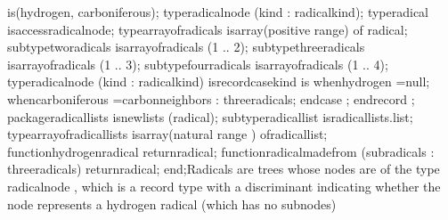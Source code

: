 \tyxtstxbf[]is\tyxtstxendbf[] (hydrogen, carboniferous);
   \tyxtstxbf[]type\tyxtstxendbf[] radical\Symuns[]node (kind : radical\Symuns[]kind);
   \tyxtstxbf[]type\tyxtstxendbf[] radical           %
\tyxtstxbf[]is\tyxtstxendbf[] \tyxtstxbf[]access\tyxtstxendbf[] radical\Symuns[]node;
   \tyxtstxbf[]type\tyxtstxendbf[] array\Symuns[]of\Symuns[]radicals %
\tyxtstxbf[]is\tyxtstxendbf[] \tyxtstxbf[]array\tyxtstxendbf[] (positive %
\tyxtstxbf[]range\tyxtstxendbf[] \Symlt[]\Symgt[]) \tyxtstxbf[]of%
\tyxtstxendbf[] radical;
   \tyxtstxbf[]subtype\tyxtstxendbf[] two\Symuns[]radicals   %
\tyxtstxbf[]is\tyxtstxendbf[] array\Symuns[]of\Symuns[]radicals (1 .. 2);
   \tyxtstxbf[]subtype\tyxtstxendbf[] three\Symuns[]radicals %
\tyxtstxbf[]is\tyxtstxendbf[] array\Symuns[]of\Symuns[]radicals (1 .. 3);
   \tyxtstxbf[]subtype\tyxtstxendbf[] four\Symuns[]radicals  %
\tyxtstxbf[]is\tyxtstxendbf[] array\Symuns[]of\Symuns[]radicals (1 .. 4);
   \tyxtstxbf[]type\tyxtstxendbf[] radical\Symuns[]node (kind : radical\Symuns[]kind) %
\tyxtstxbf[]is\tyxtstxendbf[] \tyxtstxbf[]record\tyxtstxendbf[]
      \tyxtstxbf[]case\tyxtstxendbf[] kind \tyxtstxbf[]is%
\tyxtstxendbf[]
      \tyxtstxbf[]when\tyxtstxendbf[] hydrogen =\Symgt[]
         \tyxtstxbf[]null\tyxtstxendbf[];
      \tyxtstxbf[]when\tyxtstxendbf[] carboniferous =\Symgt[]
         carbon\Symuns[]neighbors : three\Symuns[]radicals;
      \tyxtstxbf[]end\tyxtstxendbf[] \tyxtstxbf[]case%
\tyxtstxendbf[];
   \tyxtstxbf[]end\tyxtstxendbf[] \tyxtstxbf[]record%
\tyxtstxendbf[];
   \tyxtstxbf[]package\tyxtstxendbf[] radical\Symuns[]lists %
\tyxtstxbf[]is\tyxtstxendbf[] \tyxtstxbf[]new\tyxtstxendbf[] lists (radical);
   \tyxtstxbf[]subtype\tyxtstxendbf[] radical\Symuns[]list  %
\tyxtstxbf[]is\tyxtstxendbf[] radical\Symuns[]lists.list;
   \tyxtstxbf[]type\tyxtstxendbf[] array\Symuns[]of\Symuns[]radical\Symuns[]lists %
\tyxtstxbf[]is\tyxtstxendbf[]
      \tyxtstxbf[]array\tyxtstxendbf[] (natural \tyxtstxbf[]range%
\tyxtstxendbf[] \Symlt[]\Symgt[]) \tyxtstxbf[]of\tyxtstxendbf[] radical\Symuns[]list;
   \tyxtstxbf[]function\tyxtstxendbf[] hydrogen\Symuns[]radical %
\tyxtstxbf[]return\tyxtstxendbf[] radical;
   \tyxtstxbf[]function\tyxtstxendbf[] radical\Symuns[]made\Symuns[]from (subradicals : three\Symuns[]radicals)
      \tyxtstxbf[]return\tyxtstxendbf[] radical;
\tyxtstxbf[]end\tyxtstxendbf[];\Endcomp[]
\EndParbox[]
\FgEndblock[]
 Radicals are trees whose nodes are of the type \tyxffmxmono[]radical\Symuns[]node%
\tyxffmxendmono[], which is a record type with a discriminant indicating
whether the node represents a hydrogen radical (which has no subnodes)
